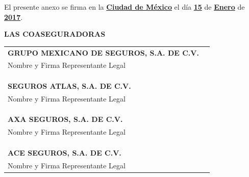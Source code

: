 \documentclass[letterpaper,10pt]{article}
\begin{document}
El presente anexo se firma en la \underline{\textbf{Ciudad de México}} el día \underline{\textbf{15}} de \underline{\textbf{Enero}} de \underline{\textbf{2017}}.\\

\begin{center}
    \textbf{LAS COASEGURADORAS}\\\vspace{2cm}
    
    \begin{tabularx}{\textwidth}{Xr}
        \textbf{GRUPO MEXICANO DE SEGUROS, S.A. DE C.V.} &\\
        Nombre y Firma Representante Legal & \underline{\hspace{5cm}}\\\\\\\\
        \textbf{SEGUROS ATLAS, S.A. DE C.V.} &\\
        Nombre y Firma Representante Legal & \underline{\hspace{5cm}}\\\\\\\\
        \textbf{AXA SEGUROS, S.A. DE C.V.} &\\
        Nombre y Firma Representante Legal & \underline{\hspace{5cm}}\\\\\\\\
        \textbf{ACE SEGUROS, S.A. DE C.V.} &\\
        Nombre y Firma Representante Legal & \underline{\hspace{5cm}}
    \end{tabularx}
\end{center}
	
\end{document}
